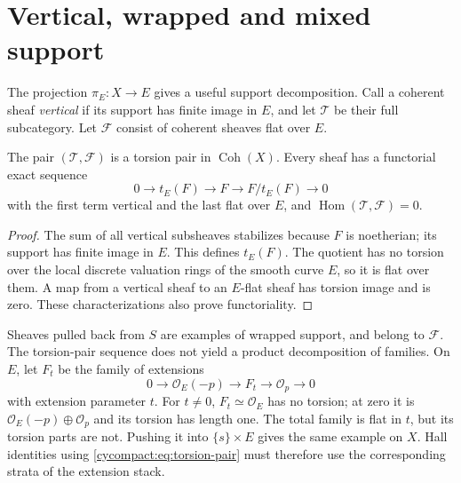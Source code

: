 \section{Vertical, wrapped and mixed support}
\label{cycompact:sec:wrapped}

The projection $\pi_E:X\to E$ gives a useful
support decomposition. Call a coherent sheaf
\emph{vertical} if its support has finite image
in $E$, and let $\mathcal T$ be their full
subcategory. Let $\mathcal F$ consist of coherent
sheaves flat over $E$.

\begin{proposition}\label{cycompact:prop:torsion-pair}
The pair $(\mathcal T,\mathcal F)$ is a torsion
pair in $\operatorname{Coh}(X)$. Every sheaf has
a functorial exact sequence
\begin{equation}\label{cycompact:eq:torsion-pair}
 0\longrightarrow t_E(F)\longrightarrow F
 \longrightarrow F/t_E(F)\longrightarrow0
\end{equation}
with the first term vertical and the last flat
over $E$, and
$\operatorname{Hom}(\mathcal T,\mathcal F)=0$.
\end{proposition}

\begin{proof}
The sum of all vertical subsheaves stabilizes
because $F$ is noetherian; its support has finite
image in $E$. This defines $t_E(F)$.
The quotient has no torsion over the local
discrete valuation rings of the smooth curve
$E$, so it is flat over them. A map from a
vertical sheaf to an $E$-flat sheaf has
torsion image and is zero. These characterizations
also prove functoriality.
\end{proof}

Sheaves pulled back from $S$ are examples of
wrapped support, and belong to $\mathcal F$.
The torsion-pair sequence does not yield a
product decomposition of families. On $E$,
let $F_t$ be the family of extensions
\[
 0\to\mathcal O_E(-p)\to F_t\to\mathcal O_p\to0
\]
with extension parameter $t$.
For $t\ne0$, $F_t\simeq\mathcal O_E$ has no
torsion; at zero it is
$\mathcal O_E(-p)\oplus\mathcal O_p$ and its
torsion has length one. The total family is
flat in $t$, but its torsion parts are not.
Pushing it into $\{s\}\times E$ gives the same
example on $X$. Hall identities using
\eqref{cycompact:eq:torsion-pair} must therefore
use the corresponding strata of the extension
stack.

